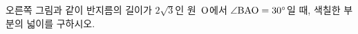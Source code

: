 \noindent\begin{minipage}[t]{0.58\linewidth}\vspace{0pt}\raggedright 오른쪽 그림과 같이 반지름의 길이가 $2\sqrt{3}$인 원~$\mathrm{O}$에서 $\angle\mathrm{BAO}=30^\circ$일 때, 색칠한 부분의 넓이를 구하시오.\end{minipage}\hfill\begin{minipage}[t]{0.4\linewidth}\vspace{0pt}\centering \resizebox{\ifdim\width>\linewidth\linewidth\else\width\fi}{!}{}\end{minipage}\par
